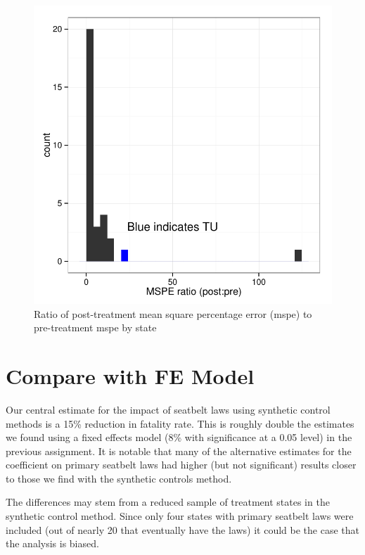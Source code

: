 \documentclass[letterpaper, 12pt]{article}
\begin{document}
\begin{figure}[htbp]
\begin{center}
  \includegraphics{img-mspeRatio.pdf}
  \caption{Ratio of post-treatment mean square percentage error (mspe) to pre-treatment mspe by state}
  \label{fig:c3}
\end{center}
\end{figure}

\section{Compare with FE Model}

Our central estimate for the impact of seatbelt laws using synthetic control methods is a 15\% reduction in fatality rate.  This is roughly double the estimates we found using a fixed effects model (8\% with significance at a 0.05 level) in the previous assignment.  It is notable that many of the alternative estimates for the coefficient on primary seatbelt laws had higher (but not significant) results closer to those we find with the synthetic controls method.  

The differences may stem from a reduced sample of treatment states in the synthetic control method.  Since only four states with primary seatbelt laws were included (out of nearly 20 that eventually have the laws) it could be the case that the analysis is biased.
\end{document}
